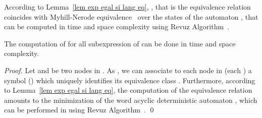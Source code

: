 \documentclass{llncs}
\begin{document}
 According to Lemma~\ref{lem exp egal si lang eq}, , that is the equivalence relation  coincides with Myhill-Nerode equivalence~\cite{Nerode} over the states of the automaton , that can be computed in  time and space complexity using Revuz Algorithm~\cite{revuz}.
 
\begin{lemma}\label{lemma5}
The computation of  for all subexpression  of  can be done in  time and space complexity.
\end{lemma}
\begin{proof}
  Let  and  be two nodes in . As , we can associate to each 
node  in  (each ) a symbol () which uniquely identifies its equivalence class . Furthermore, according to Lemma~\ref{lem exp egal si lang eq}, the computation of the equivalence relation  amounts to the minimization of the word acyclic deterministic automaton , which can be performed in  using Revuz Algorithm~\cite{revuz}. 
 \qed
\end{proof}
\end{document}
